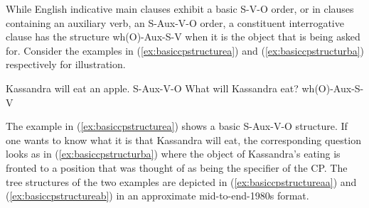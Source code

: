 While English indicative main clauses exhibit a basic S-V-O order, or in clauses containing an auxiliary verb, an S-Aux-V-O order, a constituent interrogative clause has the structure wh(O)-Aux-S-V when it is the object that is being asked for. Consider the examples in (\ref{ex:basiccpstructurea}) and (\ref{ex:basiccpstructurba}) respectively for illustration.


\begin{exe}
\ex\begin{xlist} 
\ex Kassandra will eat an apple. \hfill S-Aux-V-O\label{ex:basiccpstructurea}
\ex What will Kassandra eat? \hfill wh(O)-Aux-S-V \label{ex:basiccpstructurba}
\end{xlist}
\end{exe} 

\noindent The example in (\ref{ex:basiccpstructurea}) shows a basic S-Aux-V-O structure. If one wants to know what it is that Kassandra will eat, the corresponding question looks as in (\ref{ex:basiccpstructurba}) where the object of Kassandra's eating is fronted to a position that was thought of as being the specifier of the CP. The tree structures of the two examples are depicted in (\ref{ex:basiccpstructureaa}) and (\ref{ex:basiccpstructureab}) in an approximate mid-to-end-1980s format.

\begin{exe}
\ex
\begin{multicols}{2}
\begin{xlist}
\ex \label{ex:basiccpstructureaa}
\ex\label{ex:basiccpstructureab}
\end{xlist}
\end{multicols}
\end{exe}

